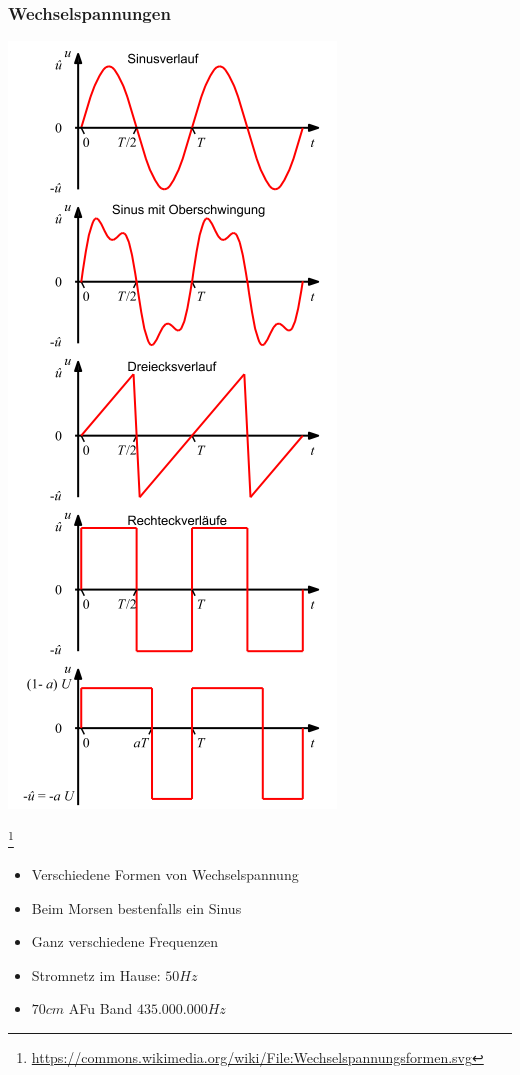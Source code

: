 \begin{frame}
    \frametitle{Wechselspannungen}
	\begin{minipage}{0.4\textwidth}
        \includegraphics[width=.5\textwidth]{e02/Wechselspannungsformen.png}
	\end{minipage}
	\footnote{\tiny \url{https://commons.wikimedia.org/wiki/File:Wechselspannungsformen.svg}}
	\begin{minipage}{0.4\textwidth}	
	\begin{itemize}
		\item Verschiedene Formen von Wechselspannung
		\item Beim Morsen bestenfalls ein Sinus
		\item Ganz verschiedene Frequenzen
		\item Stromnetz im Hause: $50Hz$ 
		\item $70cm$ AFu Band $435.000.000Hz$
	\end{itemize}
	\end{minipage}
\end{frame}

